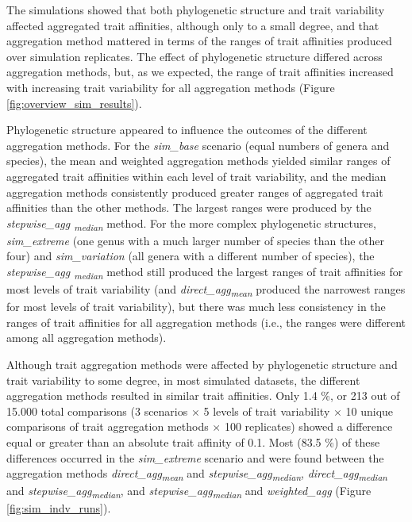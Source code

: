 \documentclass[12pt]{article}
\begin{document}
The simulations showed that both phylogenetic structure and trait variability affected aggregated trait affinities, although only to a small degree, and that aggregation method mattered in terms of the ranges of trait affinities produced over simulation replicates. The effect of phylogenetic structure differed across aggregation methods, but, as we expected, the range of trait affinities increased with increasing trait variability for all aggregation methods (Figure \ref{fig:overview_sim_results}). 

Phylogenetic structure appeared to influence the outcomes of the different aggregation methods. For the \textit{sim\_base} scenario (equal numbers of genera and species), the mean and weighted aggregation methods yielded similar ranges of aggregated trait affinities within each level of trait variability, and the median aggregation methods consistently produced greater ranges of aggregated trait affinities than the other methods. The largest ranges were produced by the \textit{stepwise\_agg \textsubscript{median}} method. For the more complex phylogenetic structures, \textit{sim\_extreme} (one genus with a much larger number of species than the other four) and \textit{sim\_variation} (all genera with a different number of species), the \textit{stepwise\_agg \textsubscript{median}} method still produced the largest ranges of trait affinities for most levels of trait variability (and \textit{direct\_agg\textsubscript{mean}} produced the narrowest ranges for most levels of trait variability), but there was much less consistency in the ranges of trait affinities for all aggregation methods (i.e., the ranges were different among all aggregation methods).

Although trait aggregation methods were affected by phylogenetic structure and trait variability to some degree, in most simulated datasets, the different aggregation methods resulted in similar trait affinities. Only 1.4 \%, or 213 out of 15.000 total comparisons (3 scenarios $\times$ 5 levels of trait variability $\times$ 10 unique comparisons of trait aggregation methods $\times$ 100 replicates) showed a difference equal or greater than an absolute trait affinity of 0.1. Most  (83.5 \%) of these differences occurred in the \textit{sim\_extreme} scenario and were found between the aggregation methods \textit{direct\_agg\textsubscript{mean}} and \textit{stepwise\_agg\textsubscript{median}}, \textit{direct\_agg\textsubscript{median}} and \textit{stepwise\_agg\textsubscript{median}}, and \textit{stepwise\_agg\textsubscript{median}} and \textit{weighted\_agg} (Figure \ref{fig:sim_indv_runs}). 
\end{document}
